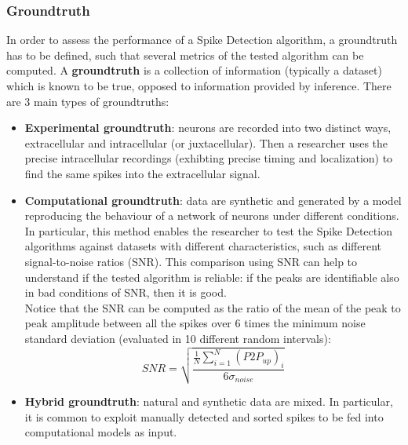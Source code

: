 \subsubsection{Groundtruth}
In order to assess the performance of a Spike Detection algorithm, a groundtruth has to
be defined, such that several metrics of the tested algorithm can be computed.
A \textbf{groundtruth} is a collection of information (typically a dataset)
which is known to be true, opposed to information provided by inference.
There are 3 main types of groundtruths:
\begin{itemize}
    \item \textbf{Experimental groundtruth}: neurons are recorded into two distinct ways,
          extracellular and intracellular (or juxtacellular). Then a researcher uses the
          precise intracellular recordings (exhibting precise timing and localization) to find
          the same spikes into the extracellular signal.
    \item \textbf{Computational groundtruth}: data are synthetic and generated by a model
          reproducing the behaviour of a network of neurons under different conditions.\\
          In particular, this method enables the researcher to test the Spike Detection
          algorithms against datasets with different characteristics, such as different
          signal-to-noise ratios (SNR). This comparison using SNR can help to understand if
          the tested algorithm is reliable: if the peaks are identifiable also in bad
          conditions of SNR, then it is good.\\
          Notice that the SNR can be computed as the ratio of the mean of the peak to peak
          amplitude between all the spikes over 6 times the minimum noise standard deviation
          (evaluated in 10 different random intervals):
          \begin{equation*}
              SNR = \sqrt{\frac{\frac{1}{N}\sum_{i=1}^N(P2P_{up})_i}{6\sigma_{noise}}}
          \end{equation*}
    \item \textbf{Hybrid groundtruth}: natural and synthetic data are mixed.
          In particular, it is common to exploit manually detected and sorted spikes to be
          fed into computational models as input.
\end{itemize}


